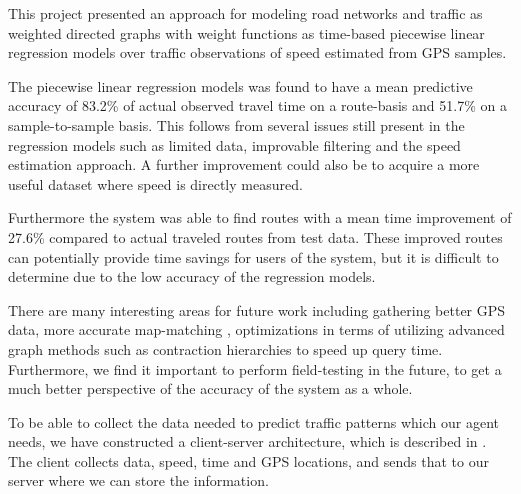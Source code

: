 This project presented an approach for modeling road networks and traffic as weighted directed graphs with weight functions as time-based piecewise linear regression models over traffic observations of speed estimated from GPS samples.

The piecewise linear regression models was found to have a mean predictive accuracy of 83.2\% of actual observed travel time on a route-basis and 51.7\% on a sample-to-sample basis. This follows from several issues still present in the regression models such as limited data, improvable filtering and the speed estimation approach. A further improvement could also be to acquire a more useful dataset where speed is directly measured.

Furthermore the system was able to find routes with a mean time improvement of 27.6\% compared to actual traveled routes from test data. These improved routes can potentially provide time savings for users of the system, but it is difficult to determine due to the low accuracy of the regression models. 

There are many interesting areas for future work including gathering better GPS data, more accurate map-matching , optimizations in terms of utilizing advanced graph methods such as contraction hierarchies to speed up query time. Furthermore, we find it important to perform field-testing in the future, to get a much better perspective of the accuracy of the system as a whole.

To be able to collect the data needed to predict traffic patterns which our agent needs, we have constructed a client-server architecture, which is described in . The client collects data, speed, time and GPS locations, and sends that to our server where we can store the information.